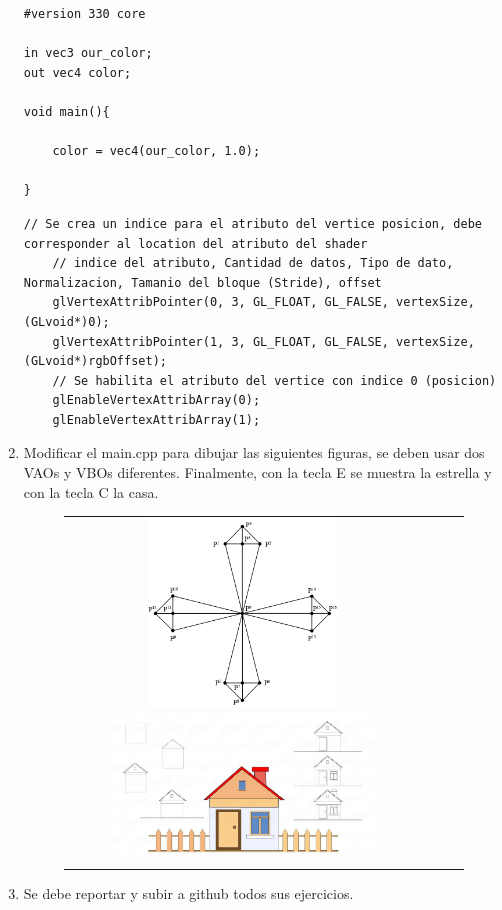 \documentclass[11pt, english]{article}
\begin{document}
\begin{enumerate}
\begin{lstlisting}[label={list:seven},caption={Fragment Shader.}, style=customc]
#version 330 core

in vec3 our_color;
out vec4 color;

void main(){
	
	color = vec4(our_color, 1.0);

}
\end{lstlisting}

\begin{lstlisting}[label={list:eight},caption={Linkeo de los atributos.}, style=customc]
	// Se crea un indice para el atributo del vertice posicion, debe corresponder al location del atributo del shader
	// indice del atributo, Cantidad de datos, Tipo de dato, Normalizacion, Tamanio del bloque (Stride), offset
	glVertexAttribPointer(0, 3, GL_FLOAT, GL_FALSE, vertexSize, (GLvoid*)0);
	glVertexAttribPointer(1, 3, GL_FLOAT, GL_FALSE, vertexSize, (GLvoid*)rgbOffset);
	// Se habilita el atributo del vertice con indice 0 (posicion)
	glEnableVertexAttribArray(0);
	glEnableVertexAttribArray(1);
\end{lstlisting}

\item Modificar el main.cpp para dibujar las siguientes
figuras, se deben usar dos VAOs y VBOs diferentes. Finalmente, con la tecla E
se muestra la estrella y con la tecla C la casa.
\begin{figure}[htb]
\begin{center}
\centering
\begin{tabular}{@{}cccc@{}}
\includegraphics[width=5cm]{images/Estrella.png}
\hspace*{0.3in}
\includegraphics[width=7cm]{images/Casa.png}
\end{tabular}
\end{center}
\end{figure}
\item Se debe reportar y subir a github todos sus ejercicios.
\end{enumerate}
\end{document}

